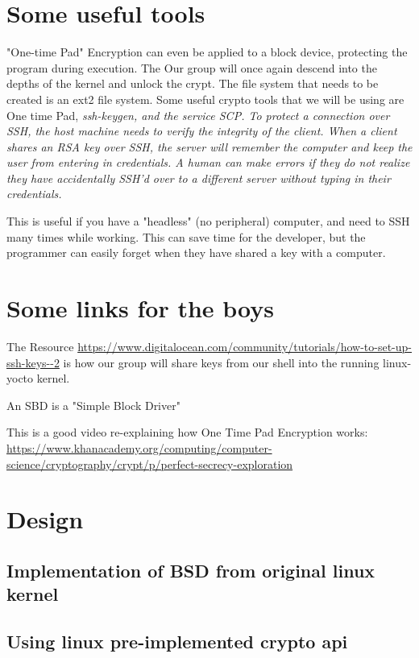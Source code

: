 \documentclass[onecolumn, draftclsnofoot,10pt, compsoc]{IEEEtran}
\begin{document}
	\section{ Some useful tools}	
	"One-time Pad" Encryption can even be applied to a block device, protecting the program during execution.
	The  Our group will once again descend into the depths of the kernel and unlock the crypt.
	The file system that needs to be created is an ext2 file system. Some useful crypto tools that we will be using are One time Pad, \it{ssh-keygen}, and the service \it{SCP}. To protect a connection over SSH, the host machine needs to verify the integrity of the client. 
	When a client shares an RSA key over SSH, the server will remember the computer and keep the user from entering in credentials.
	A human can make errors if they do not realize they have accidentally SSH'd over to a different server without typing in their credentials. 

	This is useful if you have a "headless" (no peripheral) computer, and need to SSH many times while working. This can save time for the developer, but the programmer can easily forget when they have shared a key with a computer.
	\section{ Some links for the boys }
	The Resource \url{https://www.digitalocean.com/community/tutorials/how-to-set-up-ssh-keys--2} is how our group will share keys from our shell into the running linux-yocto kernel.

	An SBD is a "Simple Block Driver" \cite{corbet_2003}	

    This is a good video re-explaining how One Time Pad Encryption works: \url{ https://www.khanacademy.org/computing/computer-science/cryptography/crypt/p/perfect-secrecy-exploration}


	\section{ Design }

	\subsection{Implementation of BSD from original linux kernel}

	\subsection{Using linux pre-implemented crypto api}
\end{document}

